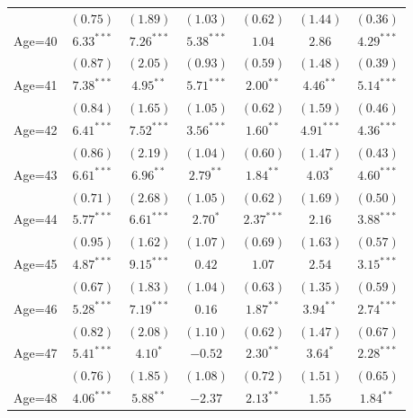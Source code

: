 \documentclass[fullpage]{paper}
\begin{document}
\begin{center}
\begin{longtable}{l c c c c c c }
            & $(0.75)$      & $(1.89)$      & $(1.03)$       & $(0.62)$      & $(1.44)$      & $(0.36)$      \\
Age=40      & $6.33^{***}$  & $7.26^{***}$  & $5.38^{***}$   & $1.04$        & $2.86$        & $4.29^{***}$  \\
            & $(0.87)$      & $(2.05)$      & $(0.93)$       & $(0.59)$      & $(1.48)$      & $(0.39)$      \\
Age=41      & $7.38^{***}$  & $4.95^{**}$   & $5.71^{***}$   & $2.00^{**}$   & $4.46^{**}$   & $5.14^{***}$  \\
            & $(0.84)$      & $(1.65)$      & $(1.05)$       & $(0.62)$      & $(1.59)$      & $(0.46)$      \\
Age=42      & $6.41^{***}$  & $7.52^{***}$  & $3.56^{***}$   & $1.60^{**}$   & $4.91^{***}$  & $4.36^{***}$  \\
            & $(0.86)$      & $(2.19)$      & $(1.04)$       & $(0.60)$      & $(1.47)$      & $(0.43)$      \\
Age=43      & $6.61^{***}$  & $6.96^{**}$   & $2.79^{**}$    & $1.84^{**}$   & $4.03^{*}$    & $4.60^{***}$  \\
            & $(0.71)$      & $(2.68)$      & $(1.05)$       & $(0.62)$      & $(1.69)$      & $(0.50)$      \\
Age=44      & $5.77^{***}$  & $6.61^{***}$  & $2.70^{*}$     & $2.37^{***}$  & $2.16$        & $3.88^{***}$  \\
            & $(0.95)$      & $(1.62)$      & $(1.07)$       & $(0.69)$      & $(1.63)$      & $(0.57)$      \\
Age=45      & $4.87^{***}$  & $9.15^{***}$  & $0.42$         & $1.07$        & $2.54$        & $3.15^{***}$  \\
            & $(0.67)$      & $(1.83)$      & $(1.04)$       & $(0.63)$      & $(1.35)$      & $(0.59)$      \\
Age=46      & $5.28^{***}$  & $7.19^{***}$  & $0.16$         & $1.87^{**}$   & $3.94^{**}$   & $2.74^{***}$  \\
            & $(0.82)$      & $(2.08)$      & $(1.10)$       & $(0.62)$      & $(1.47)$      & $(0.67)$      \\
Age=47      & $5.41^{***}$  & $4.10^{*}$    & $-0.52$        & $2.30^{**}$   & $3.64^{*}$    & $2.28^{***}$  \\
            & $(0.76)$      & $(1.85)$      & $(1.08)$       & $(0.72)$      & $(1.51)$      & $(0.65)$      \\
Age=48      & $4.06^{***}$  & $5.88^{**}$   & $-2.37$        & $2.13^{**}$   & $1.55$        & $1.84^{**}$   \\

\end{longtable}
\end{center}
\end{document}
